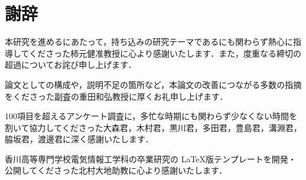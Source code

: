 \chapter{謝辞}
本研究を進めるにあたって，持ち込みの研究テーマであるにも関わらず熱心に指導してくださった柿元健准教授に心より感謝いたします．また，度重なる締切の超過についてお詫び申し上げます．
\par
論文としての構成や，説明不足の箇所など，本論文の改善につながる多数の指摘をくださった副査の重田和弘教授に厚くお礼申し上げます．
\par
100項目を超えるアンケート調査に，多忙な時期にも関わらず少なくない時間を割いて協力してくださった大森君，木村君，黒川君，多田君，豊島君，溝淵君，脇坂君，渡邊君に深く感謝いたします．
\par
香川高等専門学校電気情報工学科の卒業研究の \LaTeX 版テンプレートを開発・公開してくださった北村大地助教に心より感謝いたします．
